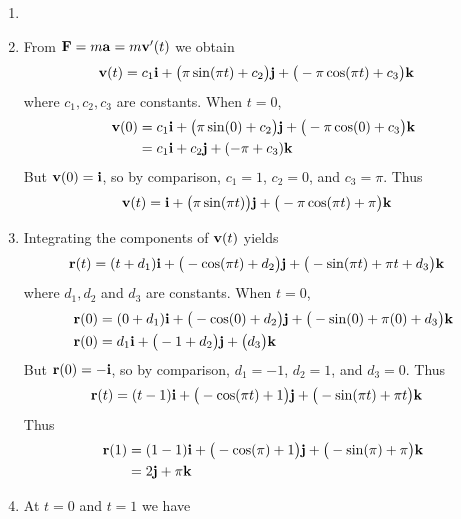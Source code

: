 \documentclass{article}
\begin{document}
\begin{enumerate}
\EEN
\item 
\BEN
\item 
From $\mathbf{F}=m\mathbf{a} = m\mathbf{v}'(t)$ we obtain
\begin{align*}
  \mathbf{v}(t) &= c_1\mathbf{i}+ \big(\pi\sin(\pi t)+c_2\big)\mathbf{j} + \big(- \pi \cos(\pi t) + c_3\big) \mathbf{k}
\end{align*}
where $c_1,c_2,c_3$ are constants. When $t=0$,  
\begin{align*}
  \mathbf{v}(0) &= c_1\mathbf{i}+ \big(\pi\sin(0)+c_2\big)\mathbf{j} + \big(- \pi \cos(0) + c_3\big) \mathbf{k}\\
  &= c_1\mathbf{i}+c_2\mathbf{j} + ( -\pi + c_3) \mathbf{k}
\end{align*}
But $\mathbf{v}(0) = \mathbf{i}$, so by comparison, $c_1= 1$, $c_2 = 0$, and $c_3=\pi$. Thus
\begin{align*}
  \mathbf{v}(t) &= \mathbf{i}+ \big(\pi\sin(\pi t)\big)\mathbf{j} + \big(- \pi \cos(\pi t) + \pi\big) \mathbf{k}
\end{align*}
\item Integrating the components of $\mathbf{v}(t)$ yields
\begin{align*}
  \mathbf{r}(t) &= (t+d_1)\mathbf{i}+ \big(-\cos(\pi t)+d_2\big)\mathbf{j} + \big(- \sin(\pi t) + \pi t + d_3\big) \mathbf{k}
\end{align*}
where $d_1,d_2$ and $d_3$ are constants. When $t=0$,  
\begin{align*}
  \mathbf{r}(0) &= (0+d_1)\mathbf{i}+ \big(-\cos(0)+d_2\big)\mathbf{j} + \big(- \sin(0) + \pi (0) + d_3\big) \mathbf{k} \\
  \mathbf{r}(0) &= d_1\mathbf{i}+ \big(-1+d_2\big)\mathbf{j} + \big(d_3\big) \mathbf{k}
\end{align*}
But $\mathbf{r}(0) = -\mathbf{i}$, so by comparison, $d_1= -1$, $d_2 = 1$, and $d_3=0$. Thus
\begin{align*}
  \mathbf{r}(t) &= (t-1)\mathbf{i}+ \big(-\cos(\pi t)+1\big)\mathbf{j} + \big(- \sin(\pi t) + \pi t\big) \mathbf{k}
\end{align*}
Thus
\begin{align*}
  \mathbf{r}(1) &= (1-1)\mathbf{i}+ \big(-\cos(\pi)+1\big)\mathbf{j} + \big(- \sin(\pi) + \pi \big) \mathbf{k} \\
  &= 2\mathbf{j} + \pi\mathbf{k}
\end{align*}
\item At $t=0$ and $t=1$ we have 
\begin{align*}

\end{align*}
\end{enumerate}
\end{document}

